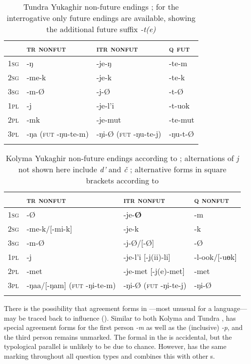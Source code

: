\begin{table}
\caption{Tundra Yukaghir non-future endings \citep[18]{Maslova2003b}; for the interrogative only future endings are available, showing the additional future suffix \textit{-t(e)}}
\label{tab:yuka:6}
\begin{tabularx}{\textwidth}{XXXl}
\lsptoprule
& \textbf{\textsc{tr nonfut}} & \textbf{\textsc{itr nonfut}} & \textsc{q} \textbf{\textsc{fut}}\\
\midrule
1\textsc{sg} & -ŋ & -je-ŋ & -te-m\\
2\textsc{sg} & -me-k & -je-k & -te-k\\
3\textsc{sg} & -m-Ø & -j-Ø & -t-Ø\\
1\textsc{pl} & -j & -je-l’i & -t-uok\\
2\textsc{pl} & -mk & -je-mut & -te-mut\\
3\textsc{pl} & -ŋa (\textsc{fut} -ŋu-te-m) & -ŋi-Ø (\textsc{fut} -ŋu-te-j) & -ŋu-t-Ø\\
\lspbottomrule
\end{tabularx}
\end{table}

\begin{table}
\caption{Kolyma Yukaghir non-future endings according to \citet[140]{Maslova2003a}; alternations of \textit{j} not shown here include \textit{d’} and \textit{č} \citep[43]{Maslova2003a}; alternative forms in square brackets according to \cite[228f.]{Nagasaki2011}}
\label{tab:yuka:7}
\begin{tabularx}{\textwidth}{Xlll}
\lsptoprule
& \textbf{\textsc{tr nonfut}} & \textbf{\textsc{itr nonfut}} & \textsc{q} \textbf{\textsc{nonfut}}\\
\midrule
1\textsc{sg} & -Ø & -je-\textbf{Ø} & -m\\
2\textsc{sg} & -me-k/[-mi-k] & -je-k & -k\\
3\textsc{sg} & -m-Ø & -j-Ø/[-Ø] & -Ø\\
1\textsc{pl} & -j & -je-l’i [-j(ii)-li] & -l-ook/[-uɵk]\\
2\textsc{pl} & -met & -je-met [-j(e)-met] & -met\\
3\textsc{pl} & -ŋaa/[-ŋam] (\textsc{fut} -ŋi-te-m) & -ŋi-Ø (\textsc{fut} -ŋi-te-j) & -ŋi-Ø\\
\lspbottomrule
\end{tabularx}
\end{table}

There is the possibility that  agreement forms in ---most unusual for a  language---may be traced back to  influence (). Similar to both Kolyma and Tundra ,  has special agreement forms for the first person  \textit{-m} as well as the  (inclusive) \textit{-p}, and the third person  remains unmarked. The formal  in the  is accidental, but the typological parallel is unlikely to be due to chance. However,  has the same marking throughout all question types and combines this with other s.


